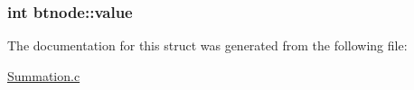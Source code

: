 \subsubsection[{\texorpdfstring{value}{value}}]{\setlength{\rightskip}{0pt plus 5cm}int btnode\+::value}\hypertarget{structbtnode_a616f93e36ddf887708b73f6e74cd753e}{}\label{structbtnode_a616f93e36ddf887708b73f6e74cd753e}


The documentation for this struct was generated from the following file\+:\begin{DoxyCompactItemize}
\item 
\hyperlink{Summation_8c}{Summation.\+c}\end{DoxyCompactItemize}
